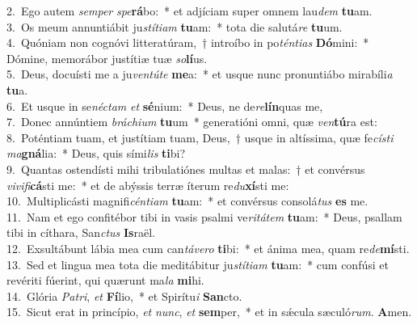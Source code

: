 {2.~}Ego autem \textit{sem}\textit{per} \textit{spe}\textbf{rá}bo:~* et adjíciam super omnem lau\textit{dem} \textbf{tu}am.\\
{3.~}Os meum annuntiábit ju\textit{stí}\textit{ti}\textit{am} \textbf{tu}am:~* tota die salutá\textit{re} \textbf{tu}um.\\
{4.~}Quóniam non cognóvi litteratúram,~† introíbo in po\textit{tén}\textit{ti}\textit{as} \textbf{Dó}mini:~* Dómine, memorábor justítiæ tuæ \textit{so}\textbf{lí}us.\\
{5.~}Deus, docuísti me a ju\textit{ven}\textit{tú}\textit{te} \textbf{me}a:~* et usque nunc pronuntiábo mirabíli\textit{a} \textbf{tu}a.\\
{6.~}Et usque in se\textit{né}\textit{ctam} \textit{et} \textbf{sé}nium:~* Deus, ne de\textit{re}\textbf{lín}quas me,\\
{7.~}Donec annúntiem \textit{brá}\textit{chi}\textit{um} \textbf{tu}um~* generatióni omni, quæ \textit{ven}\textbf{tú}ra est:\\
{8.~}Poténtiam tuam, et justítiam tuam, Deus,~† usque in altíssima, quæ fe\textit{cí}\textit{sti} \textit{ma}\textbf{gná}lia:~* Deus, quis sími\textit{lis} \textbf{ti}bi?\\
{9.~}Quantas ostendísti mihi tribulatiónes multas et malas:~† et convérsus \textit{vi}\textit{vi}\textit{fi}\textbf{cá}sti me:~* et de abýssis terræ íterum re\textit{du}\textbf{xí}sti me:\\
{10.~}Multiplicásti magnifi\textit{cén}\textit{ti}\textit{am} \textbf{tu}am:~* et convérsus consolá\textit{tus} \textbf{es} me.\\
{11.~}Nam et ego confitébor tibi in vasis psalmi ve\textit{ri}\textit{tá}\textit{tem} \textbf{tu}am:~* Deus, psallam tibi in cíthara, San\textit{ctus} \textbf{Is}raël.\\
{12.~}Exsultábunt lábia mea cum can\textit{tá}\textit{ve}\textit{ro} \textbf{ti}bi:~* et ánima mea, quam re\textit{de}\textbf{mí}sti.\\
{13.~}Sed et lingua mea tota die meditábitur ju\textit{stí}\textit{ti}\textit{am} \textbf{tu}am:~* cum confúsi et revériti fúerint, qui quærunt ma\textit{la} \textbf{mi}hi.\\
{14.~}Glória \textit{Pa}\textit{tri}, \textit{et} \textbf{Fí}lio,~* et Spirítu\textit{i} \textbf{San}cto.\\
{15.~}Sicut erat in princípio, \textit{et} \textit{nunc}, \textit{et} \textbf{sem}per,~* et in sǽcula sæculó\textit{rum}. \textbf{A}men.\\
